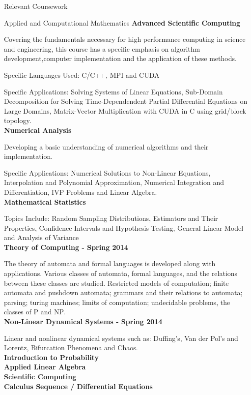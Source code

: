 \documentclass{resume} %
\begin{document}
\begin{rSection}{Relevant Coursework}
\begin{rSubsection}{Applied and Computational Mathematics}{}{}{}
\textbf{Advanced Scientific Computing}
\item Covering the fundamentals necessary for high performance computing in science and engineering, this course has a specific emphasis on algorithm development,computer implementation and the application of these methods.
\item Specific Languages Used: C/C++, MPI and CUDA
\item Specific Applications: Solving Systems of Linear Equations, Sub-Domain Decomposition for Solving Time-Dependendent Partial Differential Equations on Large Domains, Matrix-Vector Multiplication with CUDA in C using grid/block topology. \\
\textbf{Numerical Analysis}
\item Developing a basic understanding of numerical algorithms and their implementation.
\item Specific Applications: Numerical Solutions to Non-Linear Equations, Interpolation and Polynomial Approximation, Numerical Integration and Differentiation, IVP Problems and Linear Algebra. \\
\textbf{Mathematical Statistics}
\item Topics Include: Random Sampling Distributions, Estimators and Their Properties, Confidence Intervals and Hypothesis Testing, General Linear Model and Analysis of Variance \\
\textbf{Theory of Computing - Spring 2014}
\item The theory of automata and formal languages is developed along with applications. Various classes of automata, formal languages, and the relations between these classes are studied. Restricted models of computation; finite automata and pushdown automata; grammars and their relations to automata; parsing; turing machines; limits of computation; undecidable problems, the classes of P and NP.\\
\textbf{Non-Linear Dynamical Systems - Spring 2014}
\item Linear and nonlinear dynamical systems such as: Duffing’s, Van der Pol’s and Lorentz, Bifurcation Phenomena and Chaos.\\
\textbf{Introduction to Probability} \\
\textbf{Applied Linear Algebra} \\
\textbf{Scientific Computing} \\
\textbf{Calculus Sequence / Differential Equations} \\
\end{rSubsection}
\end{rSection}
\end{document}
